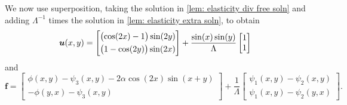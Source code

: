 \documentclass[a4paper,12pt]{article}
\newcommand{\bs}[1]{\boldsymbol{#1}}
\begin{document}
We now use superposition, taking the solution in
\cref{lem: elasticity div free soln} and adding $\Lambda^{-1}$ times the
solution in \cref{lem: elasticity extra soln}, to obtain
\[
\bs{u}(x,y)=\begin{bmatrix}
\bigl(\cos(2x)-1\bigr)\sin(2y)\\[1\jot]
\bigl(1-\cos(2y)\bigr)\sin(2x)\end{bmatrix}
+\frac{\sin(x)\sin(y)}{\Lambda}\begin{bmatrix}1\\ 1 \end{bmatrix}
\]
and
\[
\bs{f}=\begin{bmatrix}
\phi(x,y)-\psi_3(x,y)-2\alpha\cos(2x)\sin(x+y)\\
-\phi(y,x)-\psi_3(x,y)\end{bmatrix}
+\frac{1}{\Lambda}\begin{bmatrix}
\psi_1(x,y)-\psi_2(x,y)\\
\psi_1(x,y)-\psi_2(y,x)\end{bmatrix}.
\]
\end{document}

